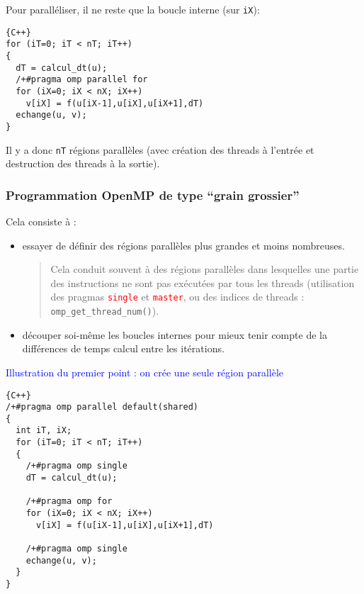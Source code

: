 \documentclass{beamer}
\begin{document}
\begin{frame}[fragile]
Pour paralléliser, il ne reste que la boucle interne (sur \verb|iX|):


\begin{lstlisting}{C++}
for (iT=0; iT < nT; iT++)
{
  dT = calcul_dt(u);
  /+#pragma omp parallel for
  for (iX=0; iX < nX; iX++)
    v[iX] = f(u[iX-1],u[iX],u[iX+1],dT)
  echange(u, v);
}
\end{lstlisting}

\vfill
Il y a donc \verb|nT| régions parallèles (avec création des threads à l'entrée et destruction des threads à la sortie).
\vfill
\end{frame}

\begin{frame}[fragile]
	\frametitle{Programmation OpenMP de type ``grain grossier''}

\vfill
Cela consiste à :
\medskip

\begin{itemize}
	\item 
	essayer de définir des régions parallèles plus grandes et moins nombreuses.
\vfill

\begin{quote}
	Cela conduit souvent à des régions parallèles dans lesquelles une partie des instructions ne sont pas exécutées par tous les threads (utilisation des pragmas \textcolor{red}{\tt single} et \textcolor{red}{\tt master}, ou des indices de threads : {\tt omp\_get\_thread\_num()}).
\end{quote}

	\item découper soi-même les boucles internes pour mieux tenir compte de la différences de temps calcul entre les itérations.
\end{itemize}

\vfill
\end{frame}

\begin{frame}[fragile]
	\textcolor{blue}{Illustration du premier point : on crée une seule région parallèle}
	
	
	\begin{lstlisting}{C++}
/+#pragma omp parallel default(shared)
{
  int iT, iX;
  for (iT=0; iT < nT; iT++)
  {
    /+#pragma omp single
    dT = calcul_dt(u);
    
    /+#pragma omp for
    for (iX=0; iX < nX; iX++)
      v[iX] = f(u[iX-1],u[iX],u[iX+1],dT)

    /+#pragma omp single
    echange(u, v);
  }
}
\end{lstlisting}
	
\vfill
\end{frame}
\end{document}
